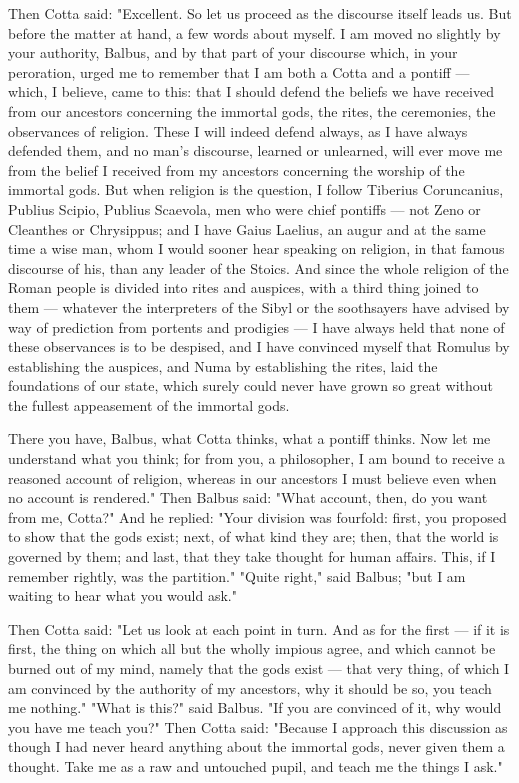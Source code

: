  Then Cotta said: "Excellent. So let us proceed as the discourse itself leads us. But before the matter at hand, a few words about myself. I am moved no slightly by your authority, Balbus, and by that part of your discourse which, in your peroration, urged me to remember that I am both a Cotta and a pontiff — which, I believe, came to this: that I should defend the beliefs we have received from our ancestors concerning the immortal gods, the rites, the ceremonies, the observances of religion. These I will indeed defend always, as I have always defended them, and no man's discourse, learned or unlearned, will ever move me from the belief I received from my ancestors concerning the worship of the immortal gods. But when religion is the question, I follow Tiberius Coruncanius, Publius Scipio, Publius Scaevola, men who were chief pontiffs — not Zeno or Cleanthes or Chrysippus; and I have Gaius Laelius, an augur and at the same time a wise man, whom I would sooner hear speaking on religion, in that famous discourse of his, than any leader of the Stoics. And since the whole religion of the Roman people is divided into rites and auspices, with a third thing joined to them — whatever the interpreters of the Sibyl or the soothsayers have advised by way of prediction from portents and prodigies — I have always held that none of these observances is to be despised, and I have convinced myself that Romulus by establishing the auspices, and Numa by establishing the rites, laid the foundations of our state, which surely could never have grown so great without the fullest appeasement of the immortal gods.

 There you have, Balbus, what Cotta thinks, what a pontiff thinks. Now let me understand what you think; for from you, a philosopher, I am bound to receive a reasoned account of religion, whereas in our ancestors I must believe even when no account is rendered." Then Balbus said: "What account, then, do you want from me, Cotta?" And he replied: "Your division was fourfold: first, you proposed to show that the gods exist; next, of what kind they are; then, that the world is governed by them; and last, that they take thought for human affairs. This, if I remember rightly, was the partition." "Quite right," said Balbus; "but I am waiting to hear what you would ask."

 Then Cotta said: "Let us look at each point in turn. And as for the first — if it is first, the thing on which all but the wholly impious agree, and which cannot be burned out of my mind, namely that the gods exist — that very thing, of which I am convinced by the authority of my ancestors, why it should be so, you teach me nothing." "What is this?" said Balbus. "If you are convinced of it, why would you have me teach you?" Then Cotta said: "Because I approach this discussion as though I had never heard anything about the immortal gods, never given them a thought. Take me as a raw and untouched pupil, and teach me the things I ask."

